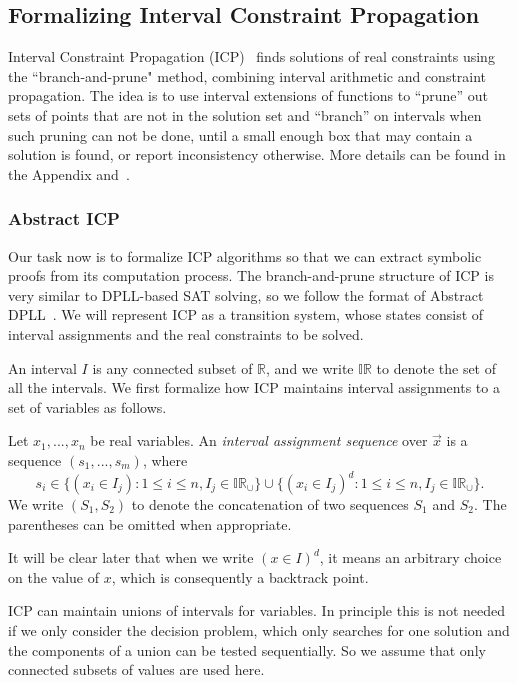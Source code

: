 \documentclass[envcountsect]{llncs}
\begin{document}
\subsection{Formalizing Interval Constraint Propagation}

Interval Constraint Propagation (ICP)~\cite{handbookICP} finds
solutions of real constraints using the ``branch-and-prune" method, combining
interval arithmetic and constraint propagation. The idea is to use interval
extensions of functions to ``prune'' out sets of points that are not in the
solution set and ``branch'' on intervals when
such pruning can not be done, until a small enough box that may
contain a solution is found, or report inconsistency otherwise. More details
can be found in the Appendix and~\cite{}.
\subsubsection{Abstract ICP} Our task now is to formalize ICP algorithms
so that we can extract symbolic proofs from its computation process. The
branch-and-prune structure of ICP is very similar to DPLL-based SAT solving, so
we follow the format of Abstract DPLL~\cite{}. We will represent ICP
as a transition system, whose states consist of interval assignments and the
real constraints to be solved.

An interval $I$ is any connected subset of
$\mathbb{R}$, and we write $\mathbb{IR}$ to denote the set of all the intervals.
We first formalize how ICP maintains interval assignments to a set of variables
as follows.
\begin{definition}
Let $x_1,...,x_n$ be real variables. An {\em interval assignment sequence} over
$\vec x$ is a sequence $(s_1,...,s_m)$, where
$$s_i\in \{(x_i\in I_j): 1\leq i\leq n, I_j\in
\mathbb{IR}_{\cup}\}\cup\{(x_i\in I_j)^d: 1\leq i\leq n, I_j\in
\mathbb{IR}_{\cup}\}.
$$
We write $(S_1, S_2)$ to denote the concatenation of two sequences $S_1$ and
$S_2$. The parentheses can be omitted when appropriate.
\end{definition}
It will be clear later that when we write $(x\in I)^d$, it means an arbitrary
choice on the value of $x$, which is consequently a backtrack point.
\begin{remark}
ICP can maintain unions of intervals for variables. In principle this is not
needed if we only consider the decision problem, which only searches for
one solution and the components of a union can be tested sequentially. So we
assume that only connected subsets of values are used here.
\end{remark}
\end{document}
